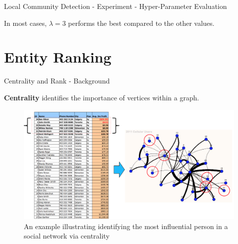 \documentclass[9pt]{beamer}
\newcommand{\themename}{\textbf{\textsc{metropolis}}\xspace}
\begin{document}
\begin{frame}{Local Community Detection - Experiment - Hyper-Parameter Evaluation}
\begin{figure}[h]
\begin{subfigure}[b]{\textwidth}
\centering
\end{subfigure}
\label{hyper}
\end{figure}
In most cases, $\lambda=3$ performs the best compared to the other values.
\end{frame}

\section{Entity Ranking}

\begin{frame}{Centrality and Rank - Background}





\textbf{Centrality} identifies the importance of vertices within a graph.
\vspace{-0.11in}
\begin{figure}[H]
\centering
\includegraphics[scale = 0.29]{famous_example.png}
\caption{An example illustrating identifying the most influential person in a social network via centrality}
\end{figure}
\end{frame}
\end{document}
